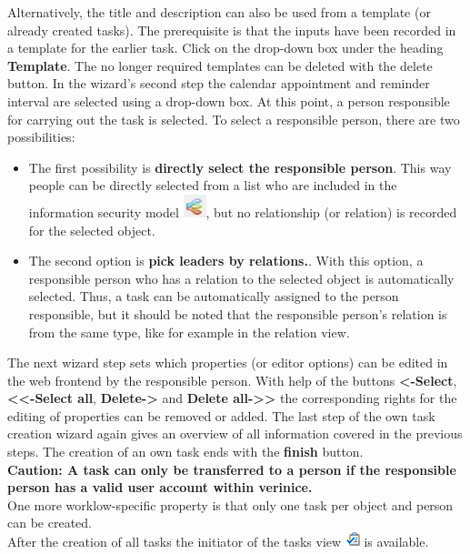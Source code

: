 \documentclass[a4paper,10pt]{book}
\begin{document}
Alternatively, the title and description can also be used from a template (or already created tasks). The prerequisite is that the inputs have been recorded in a template for the earlier task. Click on the drop-down box under the heading \textbf{Template}.
The no longer required templates can be deleted with the delete button.
In the wizard's second step the calendar appointment and reminder interval are selected using a drop-down box. At this point, a person responsible for carrying out the task is selected.
To select a responsible person, there are two possibilities:
\begin{itemize}
\item The first possibility is \textbf{directly select the responsible person}. This way people can be directly selected from a list who are included in the information security model \includegraphics[height=2ex]{Icon/Informationssicherheitsmodell.png},  but no relationship (or relation) is recorded for the selected object.
\item The second option is \textbf{pick leaders by relations.}.
With this option, a responsible person who has a relation to the selected object is automatically selected. Thus, a task can be automatically assigned to the person responsible, but it should be noted that the responsible person's relation is from the same type, like for example in the relation view.
\end{itemize}
The next wizard step sets which properties (or editor options) can be edited in the web frontend by the responsible person.
With help of the buttons \textbf{\textless-Select}, \textbf{\textless\textless-Select all}, \textbf{Delete-\textgreater} and \textbf{Delete all-\textgreater\textgreater} the corresponding rights for the editing of properties can be removed or added.
The last step of the own task creation wizard again gives an overview of all information covered in the previous steps.
The creation of an own task ends with the \textbf{finish} button.
\newline\\
\textbf{Caution: A task can only be transferred to a person if the responsible person has a valid user account within verinice.}
\newline\\
One more worklow-specific property is that only one task per object and person can be created.
\newline\\
After the creation of all tasks the initiator of the tasks view  \includegraphics[height=2ex]{Icon/Tasks.png} is available.
\end{document}
